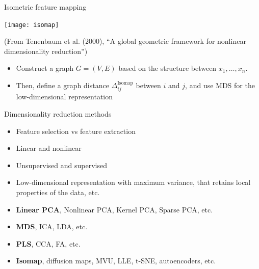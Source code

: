 \documentclass[14pt]{beamer}
\begin{document}
\begin{frame}{Isometric feature mapping}



\texttt{[image: isomap]}

{\small (From Tenenbaum et al. (2000), ``A global geometric framework for nonlinear dimensionality reduction'')}

\begin{itemize}
\item Construct a graph $G = (V, E)$ based on the structure between $x_1, \dots, x_n$.
\item Then, define a graph distance $\Delta_{ij}^{\text{Isomap}}$ between $i$ and $j$, and use MDS for the low-dimensional representation
\end{itemize}



\end{frame}





\begin{frame}{\large Dimensionality reduction methods}

\begin{itemize}
\item Feature selection vs feature extraction
\item Linear and nonlinear
\item Unsupervised and supervised
\item Low-dimensional representation with maximum variance, that retains local properties of the data, etc.
\item \textbf{Linear PCA}, Nonlinear PCA, Kernel PCA, Sparse PCA, etc.
\item \textbf{MDS}, ICA, LDA, etc.
\item \textbf{PLS}, CCA, FA, etc.
\item \textbf{Isomap}, diffusion maps, MVU, LLE, t-SNE, autoencoders, etc.
\end{itemize}
 

\end{frame}
\end{document}
